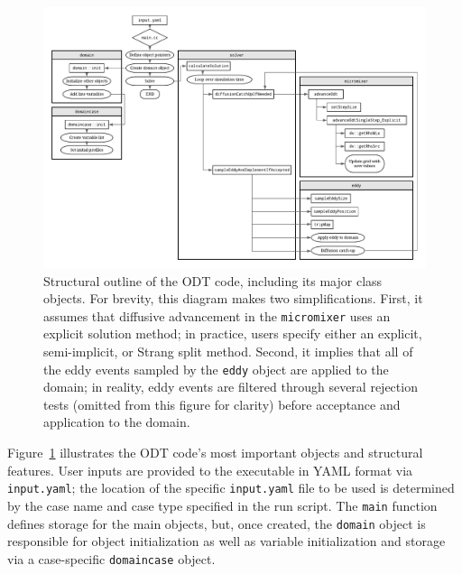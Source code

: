 \documentclass[preprint,12pt, a4paper]{elsarticle}
\begin{document}
\begin{figure}
	\centering
	\includegraphics[width=\textwidth]{../figures/odt_flow_chart.pdf} 
	\caption{Structural outline of the ODT code, including its major class objects. For brevity, this diagram makes two simplifications. First, it assumes that diffusive advancement in the \texttt{micromixer} uses an explicit solution method; in practice, users specify either an explicit, semi-implicit, or Strang split method. Second, it implies that all of the eddy events sampled by the \texttt{eddy} object are applied to the domain; in reality, eddy events are filtered through several rejection tests (omitted from this figure for clarity) before acceptance and application to the domain.}
	\label{fig:flowchart}
\end{figure}

Figure~\ref{fig:flowchart} illustrates the ODT code's most important objects and structural features. User inputs are provided to the executable in YAML \cite{Beder_2008} format via \texttt{input.yaml}; the location of the specific \texttt{input.yaml} file to be used is determined by the case name and case type specified in the run script. The \texttt{main} function defines storage for the main objects, but, once created, the \texttt{domain} object is responsible for object initialization as well as variable initialization and storage via a case-specific \texttt{domaincase} object. 
\end{document}
